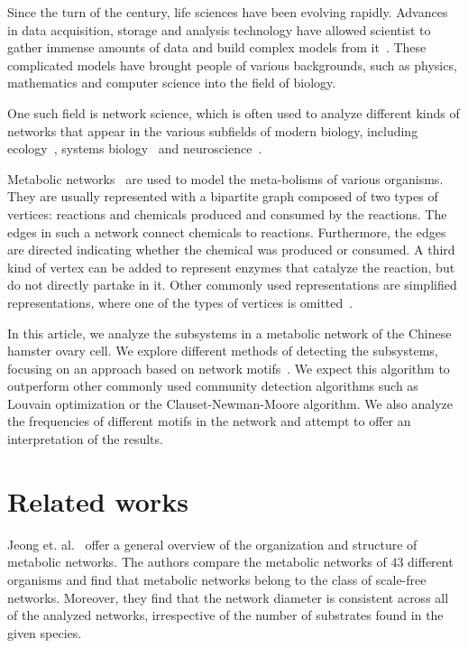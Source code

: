 Since the turn of the century, life sciences have been evolving
rapidly. Advances in data acquisition, storage and analysis technology have
allowed scientist to gather immense amounts of data and build complex models
from it~\cite{modsys}. These complicated models have brought people of various
backgrounds, such as physics, mathematics and computer science into the field
of biology.

One such field is network science, which
is often used to analyze different kinds of networks that appear in the various
subfields of modern biology, including ecology~\cite{proulx2005network}, systems
biology~\cite{barabasi2004network} and neuroscience~\cite{sporns2014contributions}.

Metabolic networks~\cite{jeong2000large} are used to model the meta-bolisms of
various organisms. They are usually represented with a bipartite graph composed
of two types of vertices: reactions and chemicals produced and consumed by the
reactions. The edges in such a network connect chemicals to
reactions. Furthermore, the edges are directed indicating whether the chemical
was produced or consumed. A third kind of vertex can be added to represent
enzymes that catalyze the reaction, but do not directly partake in
it. Other commonly used representations are simplified representations, where
one of the types of vertices is omitted~\cite{newman2010networks}.

In this article, we analyze the subsystems in a metabolic network of the Chinese
hamster ovary cell. We explore different methods of detecting the subsystems,
focusing on an approach based on network motifs~\cite{benson2016higher}. We
expect this algorithm to outperform other commonly used community detection
algorithms such as Louvain optimization or the Clauset-Newman-Moore
algorithm. We also analyze the frequencies of different motifs in the network
and attempt to offer an interpretation of the results.

\section{Related works}
\label{sec:related}

Jeong et. al.~\cite{jeong2000large} offer a general overview of the organization
and structure of metabolic networks. The authors compare the metabolic networks
of 43 different organisms and find that metabolic networks belong to the class
of scale-free networks. Moreover, they find that the network diameter is
consistent across all of the analyzed networks, irrespective of the number of
substrates found in the given species.

